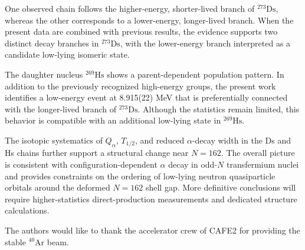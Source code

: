 \documentclass[aps,prc,reprint,superscriptaddress,floatfix]{revtex4-2}
\begin{document}
One observed chain follows the higher-energy, shorter-lived branch of $^{273}\mathrm{Ds}$, whereas the other corresponds to a lower-energy, longer-lived branch. When the present data are combined with previous results, the evidence supports two distinct decay branches in $^{273}\mathrm{Ds}$, with the lower-energy branch interpreted as a candidate low-lying isomeric state.

The daughter nucleus $^{269}\mathrm{Hs}$ shows a parent-dependent population pattern. In addition to the previously recognized high-energy groups, the present work identifies a low-energy event at 8.915(22) MeV that is preferentially connected with the longer-lived branch of $^{273}\mathrm{Ds}$. Although the statistics remain limited, this behavior is compatible with an additional low-lying state in $^{269}\mathrm{Hs}$.

The isotopic systematics of $Q_{\alpha}$, $T_{1/2}$, and reduced $\alpha$-decay width in the Ds and Hs chains further support a structural change near $N = 162$. The overall picture is consistent with configuration-dependent $\alpha$ decay in odd-$N$ transfermium nuclei and provides constraints on the ordering of low-lying neutron quasiparticle orbitals around the deformed $N = 162$ shell gap. More definitive conclusions will require higher-statistics direct-production measurements and dedicated structure calculations.

\begin{acknowledgments}
The authors would like to thank the accelerator crew of CAFE2 for providing the stable $^{40}$Ar beam.
\end{acknowledgments}


\end{document}
